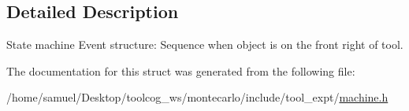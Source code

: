 \subsection{Detailed Description}
State machine Event structure\+: Sequence when object is on the front right of tool. 

The documentation for this struct was generated from the following file\+:\begin{DoxyCompactItemize}
\item 
/home/samuel/\+Desktop/toolcog\+\_\+ws/montecarlo/include/tool\+\_\+expt/\hyperlink{machine_8h}{machine.\+h}\end{DoxyCompactItemize}
